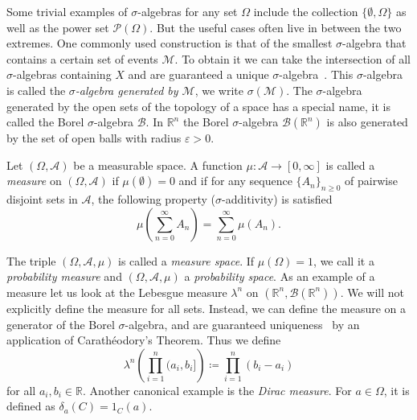 Some trivial examples of $\sigma$-algebras for any set $\Omega$ include the collection \( \{\emptyset, \Omega\} \) as well as the power set $\mathcal{P}(\Omega)$.
But the useful cases often live in between the two extremes. One commonly used construction is that of the smallest $\sigma$-algebra that contains a certain set of events $\mathcal{M}$. To obtain it we can take the intersection of all $\sigma$-algebras containing $X$ and are guaranteed a unique $\sigma$-algebra~\cite[p.52]{bremaud2020probability}. This $\sigma$-algebra is called the \textit{$\sigma$-algebra generated by $\mathcal{M}$}, we write \( \sigma(\mathcal{M}) \).
The $\sigma$-algebra generated by the open sets of the topology of a space has a special name, it is called the Borel $\sigma$-algebra $\mathcal{B}$. 
In \( \mathbb{R}^{n} \) the Borel $\sigma$-algebra $\mathcal{B}(\mathbb{R}^{n})$ is also generated by the set of open balls with radius \( \varepsilon > 0 \). 

\begin{definition}[Measure]
    Let \( (\Omega,\mathcal{A}) \) be a measurable space. A function \( \mu \colon \mathcal{A} \to [0,\infty] \) is called a  \textit{measure} on \( (\Omega,\mathcal{A}) \) if \( \mu(\emptyset) = 0 \) and if for any sequence \( \{A_{n}\}_{n \geq 0} \) of pairwise disjoint sets in $\mathcal{A}$, the following property ($\sigma$-additivity) is satisfied
    \[
        \mu( \sum_{n=0}^{\infty} A_{n}) = \sum_{n=0}^{\infty} \mu(A_{n}).
    \]
\end{definition}
The triple \( (\Omega, \mathcal{A}, \mu) \) is called a \textit{measure space}. If \( \mu(\Omega) = 1 \), we call it a \textit{probability measure} and \( (\Omega, \mathcal{A}, \mu) \) a \textit{probability space}.
As an example of a measure let us look at the Lebesgue measure $\lambda^{n}$ on \( (\mathbb{R}^{n}, \mathcal{B}(\mathbb{R}^{n})) \). 
We will not explicitly define the measure for all sets.
Instead, we can define the measure on a generator of the Borel $\sigma$-algebra, and are guaranteed uniqueness~\cite[p.61]{bremaud2020probability} by an application of Carathéodory's Theorem.
Thus we define
\[
    \lambda^{n} \left( \prod_{i=1}^{n} (a_{i},b_{i}] \right) \coloneqq \prod_{i=1}^{n} (b_{i}-a_{i})
\]
for all \( a_{i}, b_{i} \in \mathbb{R} \). Another canonical example is the \textit{Dirac measure}. For \( a \in \Omega \), it is defined as \( \delta_{a}(C) = 1_{C}(a) \).

